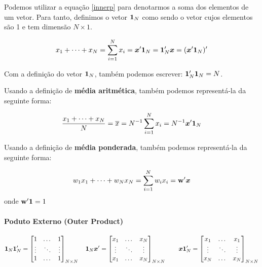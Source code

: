 \documentclass[11pt, oneside, a4paper, article]{article}
\numberwithin{equation}{section}
\begin{document}
\begin{description}
Podemos utilizar a equação \eqref{innerp} para denotarmos a soma dos elementos de um vetor.
Para tanto, definimos o vetor $\boldsymbol{1}_{N}$ como sendo o vetor cujos elementos são 1 e tem dimensão $N \times 1$.
\cite[p. 977, A.2.7]{greene-7ed}

\begin{align*}
	x_{1} + \dots + x_{N} =
	\sum_{i=1}^{N} x_{i} =
	\boldsymbol{x}' \boldsymbol{1}_{N} = 
	\boldsymbol{1}_{N}' \boldsymbol{x} = 
	(\boldsymbol{x}' \boldsymbol{1}_{N})'
\end{align*}

Com a definição do vetor $\boldsymbol{1}_{N}$, também podemos escrever:
$\boldsymbol{1}_{N}' \boldsymbol{1}_{N} = N$.

Usando a definição de \textbf{média aritmética}, também podemos representá-la da seguinte forma:

\begin{align*}
	\frac{x_{1} + \dots + x_{N}}{N} =
	\overline{x} =
	N^{-1} \sum_{i=1}^{N} x_{i} =
	N^{-1} \boldsymbol{x}' \boldsymbol{1}_{N}
\end{align*}

Usando a definição de \textbf{média ponderada}, também podemos representá-la da seguinte forma:

\begin{align*}
	w_{1}x_{1} + \dots + w_{N}x_{N} =
	\sum_{i=1}^{N} w_{i} x_{i} =
	\mathbf{w}'\boldsymbol{x}
\end{align*}
onde $\mathbf{w}'\boldsymbol{1}=1$

\paragraph{Poduto Externo (Outer Product)}

\begin{align*}
	\boldsymbol{1}_{N} \boldsymbol{1}_{N}' =
	\begin{bmatrix}
		1 & \dots & 1	 \\
		\vdots & \ddots & \vdots \\
		1 & \dots & 1	
	\end{bmatrix}_{N \times N}
	\quad
	\boldsymbol{1}_{N} \boldsymbol{x}' =
	\begin{bmatrix}
		x_{1} & \dots & x_{N} \\
		\vdots & \ddots & \vdots \\
		x_{1} & \dots & x_{N}	
	\end{bmatrix}_{N \times N}
	\qquad
	\boldsymbol{x} \boldsymbol{1}_{N}' =
	\begin{bmatrix}
		x_{1} & \dots & x_{1} \\
		\vdots & \ddots & \vdots \\
		x_{N} & \dots & x_{N}	
	\end{bmatrix}_{N \times N}
\end{align*}


\end{description}
\end{document}
